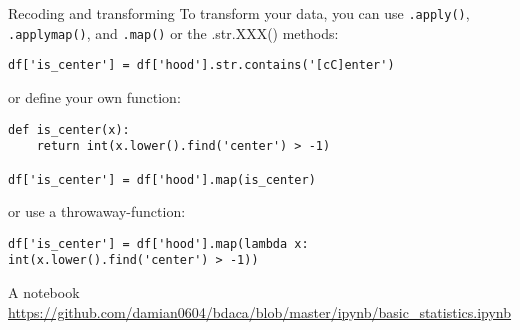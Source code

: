 \documentclass{beamer}
\begin{document}
\begin{frame}[fragile]{Recoding and transforming}
To transform your data, you can use \texttt{.apply()}, \texttt{.applymap()}, and \texttt{.map()} or the .str.XXX() methods:

\begin{lstlisting}
df['is_center'] = df['hood'].str.contains('[cC]enter')
\end{lstlisting}
or define your own function:
\begin{lstlisting}
def is_center(x):
    return int(x.lower().find('center') > -1)
    
df['is_center'] = df['hood'].map(is_center)
\end{lstlisting}
or use a throwaway-function:
\begin{lstlisting}
df['is_center'] = df['hood'].map(lambda x: int(x.lower().find('center') > -1))
\end{lstlisting}


\end{frame}



\begin{frame}{A notebook}
\url{https://github.com/damian0604/bdaca/blob/master/ipynb/basic_statistics.ipynb}

\end{frame}



\end{document}

